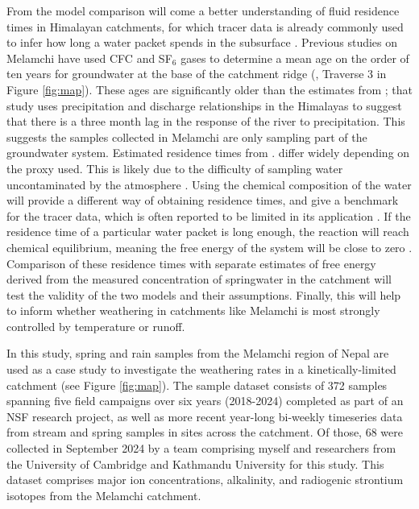 From the model comparison will come a better understanding of fluid residence times in Himalayan catchments, for which tracer data is already commonly used to infer how long a water packet spends in the subsurface \parencite{atwoodCriticalZoneResponse2023}. Previous studies on Melamchi have used CFC and SF$_6$ gases to determine a mean age on the order of ten years for groundwater at the base of the catchment ridge (\cite{atwoodCriticalZoneResponse2023}, Traverse 3 in Figure \ref{fig:map}). These ages are significantly older than the estimates from \textcite{andermannImpactTransientGroundwater2012}; that study uses precipitation and discharge relationships in the Himalayas to suggest that there is a three month lag in the response of the river to precipitation. This suggests the samples collected in Melamchi are only sampling part of the groundwater system. Estimated residence times from \textcite{atwoodCriticalZoneResponse2023}. differ widely depending on the proxy used. This is likely due to the difficulty of sampling water uncontaminated by the atmosphere \parencite{mccallumLimitationsUseEnvironmental2015}. Using the chemical composition of the water will provide a different way of obtaining residence times, and give a benchmark for the tracer data, which is often reported to be limited in its application \parencite{mccallumLimitationsUseEnvironmental2015}. If the residence time of a particular water packet is long enough, the reaction will reach chemical equilibrium, meaning the free energy of the system will be close to zero \parencite{kampmanFeldsparDissolutionKinetics2009}. Comparison of these residence times with separate estimates of free energy derived from the measured concentration of springwater in the catchment will test the validity of the two models and their assumptions. Finally, this will help to inform whether weathering in catchments like Melamchi is most strongly controlled by temperature or runoff.


\bsk

In this study, spring and rain samples from the Melamchi region of Nepal are used as a case study to investigate the weathering rates in a kinetically-limited catchment (see Figure \ref{fig:map}). The sample dataset consists of 372 samples spanning five field campaigns over six years (2018-2024) completed as part of an NSF research project, as well as more recent year-long bi-weekly timeseries data from stream and spring samples in sites across the catchment. Of those, 68 were collected in September 2024 by a team comprising myself and researchers from the University of Cambridge and Kathmandu University for this study. This dataset comprises major ion concentrations, alkalinity, and radiogenic strontium isotopes from the Melamchi catchment. 



